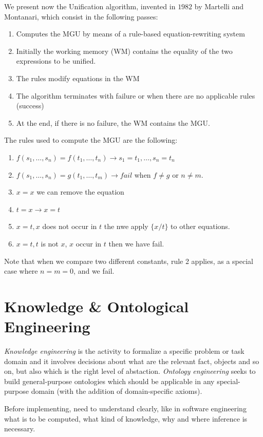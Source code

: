 We present now the Unification algorithm, invented in $1982$ by Martelli and Montanari,
which consist in the following passes:
\begin{enumerate}
   \item Computes the MGU by means of a rule-based equation-rewriting system
   \item Initially the working memory (WM) contains the equality of the two
         expressions to be unified.
   \item The rules modify equations in the WM
   \item The algorithm terminates with failure or when there are no applicable rules
	 (success)
   \item At the end, if there is no failure, the WM contains the MGU.
\end{enumerate}
The rules used to compute the MGU are the following:
\begin{enumerate}
   \item $f(s_1, \dots, s_n) = f(t_1, \dots, t_n) \to s_1 =  t_1 , \dots, s_n = t_n$
   \item $f(s_1, \dots, s_n) = g(t_1, \dots, t_m) \to fail$ when $f \neq g$ or $n \neq m$.
   \item $x = x$ we can remove the equation
   \item $t = x \to x = t$ 
   \item $x = t, x$ does not occur in $t$ the nwe apply $\{x/t\}$ to other equations.
   \item $x = t, t$ is not $x$, $x$ occur in $t$ then we have fail.
\end{enumerate}
Note that when we compare two different constants, rule 2 applies, as a special case
where $n = m = 0$, and we fail.

\section{Knowledge \& Ontological Engineering}
\emph{Knowledge engineering} is the activity to formalize a specific problem or
task domain and it involves decisions about what are the relevant fact, objects and so on,
but also which is the right level of abstaction.\newline
\emph{Ontology engineering} seeks to build general-purpose ontologies which should be
applicable in any special-purpose domain (with the addition of domain-specific axioms). 

Before implementing, need to understand clearly, like in software engineering
what is to be computed, what kind of knowledge, why and where inference is necessary.

